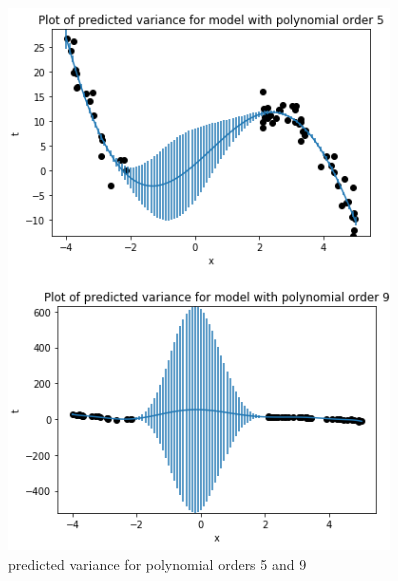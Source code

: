 \documentclass[10pt]{article}
\begin{document}
\begin{itemize}
\begin{figure}
\centering
\includegraphics[width=0.9\textwidth]{5c.png}
\caption{\label{fig:4}predicted variance for polynomial orders 5 and 9}
\end{figure}


\end{itemize}
\end{document}
